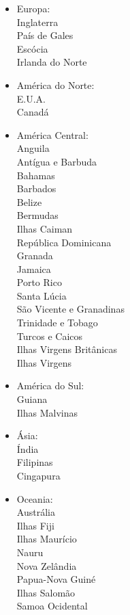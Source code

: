\documentclass[12pt,a4paper]{article} %
\begin{document}
\begin{itemize}
\item Europa:\\
Inglaterra\\
País de Gales\\
Escócia\\
Irlanda do Norte

\item América do Norte:\\
E.U.A.\\
Canadá

\item América Central:\\
Anguila\\
Antígua e Barbuda\\
Bahamas\\
Barbados\\
Belize\\
Bermudas\\
Ilhas Caiman\\
República Dominicana\\
Granada\\
Jamaica\\
Porto Rico\\
Santa Lúcia\\
São Vicente e Granadinas\\
Trinidade e Tobago\\
Turcos e Caicos\\
Ilhas Virgens Britânicas\\
Ilhas Virgens

\item América do Sul:\\
Guiana\\
Ilhas Malvinas

\item Ásia:\\
Índia\\
Filipinas\\
Cingapura

\item Oceania:\\
Austrália\\
Ilhas Fiji\\
Ilhas Maurício\\
Nauru\\
Nova Zelândia\\
Papua-Nova Guiné\\
Ilhas Salomão\\
Samoa Ocidental


\end{itemize}
\end{document}

